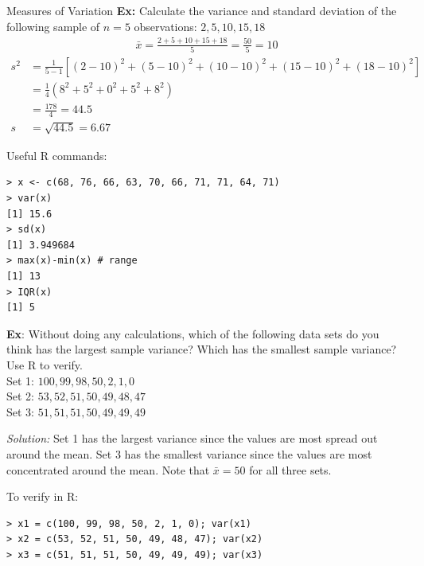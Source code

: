 \documentclass{beamer}
\begin{document}
\begin{frame}{Measures of Variation}
\textbf{Ex:}  Calculate the variance and standard deviation of the following sample of $n=5$ observations: $2, 5, 10, 15, 18$\\
\small
\begin{align*}
\bar{x} = \frac{2 + 5 + 10 + 15 + 18}{5}  = \frac{50}{5} = 10
\end{align*}
\begin{align*}
s^2 &= \frac{1}{5-1} [(2-10)^2 + (5-10)^2 + (10-10)^2 + (15-10)^2 + (18-10)^2]\\
&= \frac{1}{4} (8^2 + 5^2 + 0^2 + 5^2 + 8^2)\\
&= \frac{178}{4} = 44.5\\
s &= \sqrt{44.5} = \boxed{6.67}
\end{align*}
\end{frame}

\begin{frame}[fragile]
Useful R commands:
\begin{verbatim}
> x <- c(68, 76, 66, 63, 70, 66, 71, 71, 64, 71)
> var(x)
[1] 15.6
> sd(x)
[1] 3.949684
> max(x)-min(x) # range
[1] 13
> IQR(x)
[1] 5
\end{verbatim}
\end{frame}

\begin{frame}[fragile]
\small
\textbf{Ex}:  Without doing any calculations, which of the following data sets do you think has the largest sample variance?  Which has the smallest sample variance?  Use R to verify.\\

\vspace{10pt}
Set 1: $100, 99, 98, 50, 2, 1, 0$\\ 
Set 2: $53, 52, 51, 50, 49, 48, 47$\\
Set 3: $51, 51, 51, 50, 49, 49, 49$\\
\vspace{10pt}
{\color{blue}
\emph{Solution:} Set 1 has the largest variance since the values are most spread out around the mean.  Set 3 has the smallest variance since the values are most concentrated around the mean.  Note that $\bar{x} = 50$ for all three sets.\\
\vspace{10pt}

To verify in R:
\vspace{-5pt}
\begin{verbatim}
> x1 = c(100, 99, 98, 50, 2, 1, 0); var(x1)
> x2 = c(53, 52, 51, 50, 49, 48, 47); var(x2)
> x3 = c(51, 51, 51, 50, 49, 49, 49); var(x3)
\end{verbatim}
}
\end{frame}
\end{document}
